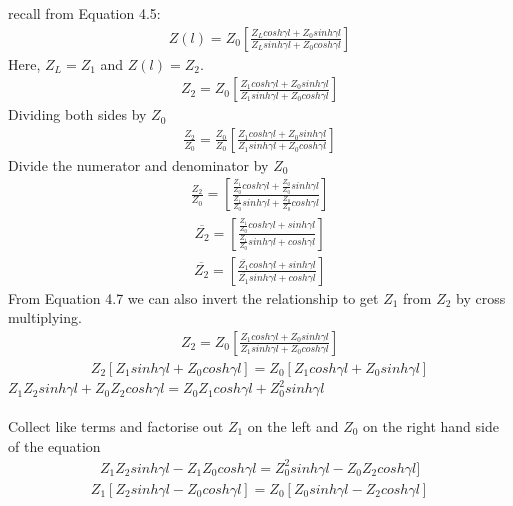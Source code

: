 recall from Equation 4.5: 
\begin{align*}
Z(l) = Z_0[\frac{Z_Lcosh\gamma l + Z_0sinh\gamma l}{Z_Lsinh\gamma l + Z_0cosh\gamma l}]
\end{align*}
Here, $Z_L = Z_1$ and $Z(l) = Z_2$.\\
\begin{align}
Z_2 = Z_0[\frac{Z_1cosh\gamma l + Z_0sinh\gamma l}{Z_1 sinh\gamma l + Z_0 cosh\gamma l}]
\end{align}
Dividing both sides by $Z_0$
\begin{align*}
\frac{Z_2}{Z_0} = \frac{Z_0}{Z_0} [\frac{Z_1cosh\gamma l + Z_0sinh\gamma l}{Z_1 sinh\gamma l + Z_0 cosh\gamma l}]
\end{align*}
Divide the numerator and denominator by $Z_0$
\begin{align*}
\frac{Z_2}{Z_0} = [\frac{\frac{Z_1}{Z_0}cosh\gamma l + \frac{Z_0}{Z_0}sinh\gamma l}{\frac{Z_1}{Z_0}sinh\gamma l + \frac{Z_0}{Z_0}cosh\gamma l}]
\end{align*}
\begin{align*}
\overline{Z_2} = [\frac{\frac{Z_1}{Z_0}cosh\gamma l + sinh\gamma l}{\frac{Z_1}{Z_0}sinh\gamma l + cosh\gamma l}]
\end{align*}
\begin{align*}
\overline{Z_2} = [\frac{\overline{Z_1}cosh\gamma l + sinh\gamma l}{\overline{Z_1}sinh\gamma l + cosh\gamma l}]
\end{align*}
From Equation 4.7 we can also invert the relationship to get $Z_1$ from $Z_2$ by cross multiplying.
\begin{align*}
Z_2 = Z_0[\frac{Z_1cosh\gamma l + Z_0sinh\gamma l}{Z_1 sinh\gamma l + Z_0 cosh\gamma l}]
\end{align*}
\begin{align*}
Z_2[Z_1sinh\gamma l + Z_0cosh\gamma l] = Z_0[Z_1cosh\gamma l + Z_0sinh\gamma l]
\end{align*}
$Z_1Z_2sinh\gamma l + Z_0Z_2cosh\gamma l = Z_0Z_1cosh\gamma l + Z_0^2sinh\gamma l$\\\\
Collect like terms and factorise out $Z_1$ on the left and $Z_0$ on the right hand side of the equation
\begin{align*}
Z_1Z_2sinh\gamma l - Z_1Z_0cosh\gamma l = Z_0^2sinh\gamma l - Z_0Z_2cosh\gamma l]
\end{align*}
\begin{align*}
Z_1[Z_2sinh\gamma l - Z_0cosh\gamma l] = Z_0[Z_0sinh\gamma l - Z_2cosh\gamma l]
\end{align*}

